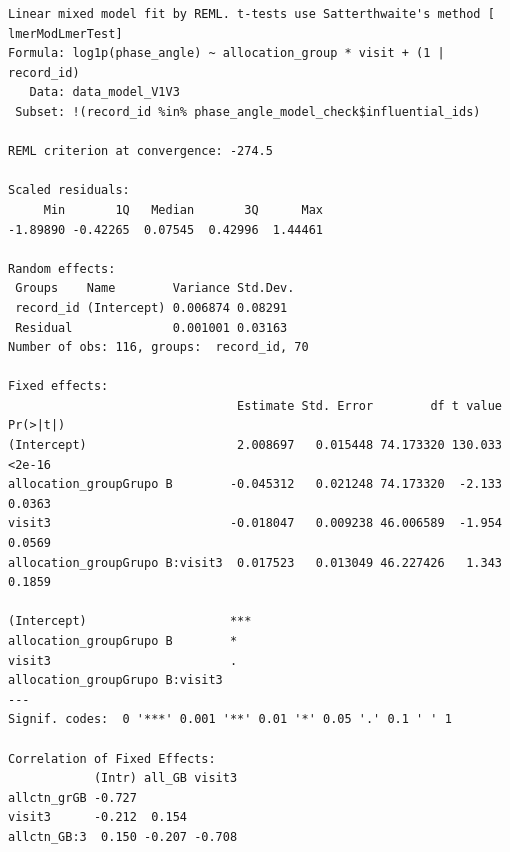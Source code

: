 \documentclass[
  letterpaper,
  DIV=11,
  numbers=noendperiod]{scrartcl}
\newenvironment{Shaded}{\begin{snugshade}}{\end{snugshade}}
\newcommand{\NormalTok}[1]{\textcolor[rgb]{0.00,0.23,0.31}{#1}}
\newcommand{\SpecialCharTok}[1]{\textcolor[rgb]{0.37,0.37,0.37}{#1}}
\begin{document}
\begin{verbatim}
Linear mixed model fit by REML. t-tests use Satterthwaite's method [
lmerModLmerTest]
Formula: log1p(phase_angle) ~ allocation_group * visit + (1 | record_id)
   Data: data_model_V1V3
 Subset: !(record_id %in% phase_angle_model_check$influential_ids)

REML criterion at convergence: -274.5

Scaled residuals: 
     Min       1Q   Median       3Q      Max 
-1.89890 -0.42265  0.07545  0.42996  1.44461 

Random effects:
 Groups    Name        Variance Std.Dev.
 record_id (Intercept) 0.006874 0.08291 
 Residual              0.001001 0.03163 
Number of obs: 116, groups:  record_id, 70

Fixed effects:
                                Estimate Std. Error        df t value Pr(>|t|)
(Intercept)                     2.008697   0.015448 74.173320 130.033   <2e-16
allocation_groupGrupo B        -0.045312   0.021248 74.173320  -2.133   0.0363
visit3                         -0.018047   0.009238 46.006589  -1.954   0.0569
allocation_groupGrupo B:visit3  0.017523   0.013049 46.227426   1.343   0.1859
                                  
(Intercept)                    ***
allocation_groupGrupo B        *  
visit3                         .  
allocation_groupGrupo B:visit3    
---
Signif. codes:  0 '***' 0.001 '**' 0.01 '*' 0.05 '.' 0.1 ' ' 1

Correlation of Fixed Effects:
            (Intr) all_GB visit3
allctn_grGB -0.727              
visit3      -0.212  0.154       
allctn_GB:3  0.150 -0.207 -0.708
\end{verbatim}

\begin{Shaded}
\end{Shaded}
\end{document}

